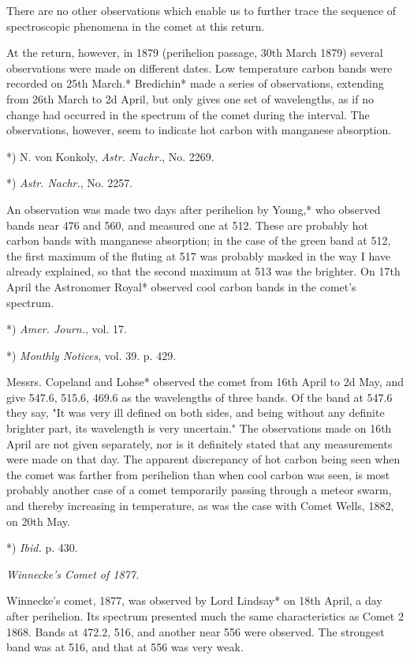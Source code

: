 \documentclass[a4paper, 12pt, oneside, polutonikogreek, english]{article}
\begin{document}
There are no other observations which enable us to further trace the sequence of spectroscopic phenomena in the comet at this return.

At the return, however, in 1879 (perihelion passage, 30th March 1879) several observations were made on different dates. Low temperature carbon bands were recorded on 25th March.* Bredichin* made a series of observations, extending from 26th March to 2d April, but only gives one set of wavelengths, as if no change had occurred in the spectrum of the comet during the interval. The observations, however, seem to indicate hot carbon with manganese absorption.

*) N. von Konkoly, \emph{Astr. Nachr.}, No. 2269.

*) \emph{Astr. Nachr.}, No. 2257.

An observation was made two days after perihelion by Young,* who observed bands near 476 and 560, and measured one at 512. These are probably hot carbon bands with manganese absorption; in the case of the green band at 512, the first maximum of the fluting at 517 was probably masked in the way I have already explained, so that the second maximum at 513 was the brighter. On 17th April the Astronomer Royal* observed cool carbon bands in the comet's spectrum.

*) \emph{Amer. Journ.}, vol. 17.

*) \emph{Monthly Notices}, vol. 39. p. 429.

Messrs. Copeland and Lohse* observed the comet from 16th April to 2d May, and give 547.6, 515.6, 469.6 as the wavelengths of three bands. Of the band at 547.6 they say, "It was very ill defined on both sides, and being without any definite brighter part, its wavelength is very uncertain." The observations made on 16th April are not given separately, nor is it definitely stated that any measurements were made on that day. The apparent discrepancy of hot carbon being seen when the comet was farther from perihelion than when cool carbon was seen, is most probably another case of a comet temporarily passing through a meteor swarm, and thereby increasing in temperature, as was the case with Comet Wells, 1882, on 20th May.

*) \emph{Ibid.} p. 430.

\emph{Winnecke’s Comet of 1877.}

Winnecke's comet, 1877, was observed by Lord Lindsay* on 18th April, a day after perihelion. Its spectrum presented much the same characteristics as Comet 2 1868. Bands at 472.2, 516, and another near 556 were observed. The strongest band was at 516, and that at 556 was very weak.
\end{document}
